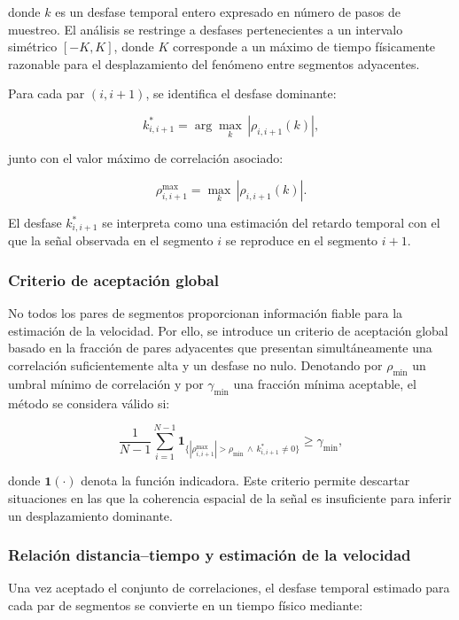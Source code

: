 \documentclass[
  spanish,
  us-letterpaper,
]{scrreprt}
\numberwithin{equation}{section}
\begin{document}
donde \(k\) es un desfase temporal entero expresado en número de pasos
de muestreo. El análisis se restringe a desfases pertenecientes a un
intervalo simétrico \([-K, K]\), donde \(K\) corresponde a un máximo de
tiempo físicamente razonable para el desplazamiento del fenómeno entre
segmentos adyacentes.

Para cada par \((i, i+1)\), se identifica el desfase dominante:

\[
k^*_{i,i+1} = \arg\max_k \, |\rho_{i,i+1}(k)|,
\]

junto con el valor máximo de correlación asociado:

\[
\rho^{\max}_{i,i+1} = \max_k \, |\rho_{i,i+1}(k)|.
\]

El desfase \(k^*_{i,i+1}\) se interpreta como una estimación del retardo
temporal con el que la señal observada en el segmento \(i\) se reproduce
en el segmento \(i+1\).

\subsubsection{Criterio de aceptación
global}\label{criterio-de-aceptaciuxf3n-global}

No todos los pares de segmentos proporcionan información fiable para la
estimación de la velocidad. Por ello, se introduce un criterio de
aceptación global basado en la fracción de pares adyacentes que
presentan simultáneamente una correlación suficientemente alta y un
desfase no nulo. Denotando por \(\rho_{\min}\) un umbral mínimo de
correlación y por \(\gamma_{\min}\) una fracción mínima aceptable, el
método se considera válido si:

\[
\frac{1}{N-1} \sum_{i=1}^{N-1} \mathbf{1}_{\{|\rho^{\max}_{i,i+1}| > \rho_{\min} \, \wedge \, k^*_{i,i+1} \neq 0\}} \geq \gamma_{\min},
\]

donde \(\mathbf{1}(\cdot)\) denota la función indicadora. Este criterio
permite descartar situaciones en las que la coherencia espacial de la
señal es insuficiente para inferir un desplazamiento dominante.

\subsubsection{Relación distancia--tiempo y estimación de la
velocidad}\label{relaciuxf3n-distanciatiempo-y-estimaciuxf3n-de-la-velocidad}

Una vez aceptado el conjunto de correlaciones, el desfase temporal
estimado para cada par de segmentos se convierte en un tiempo físico
mediante:
\end{document}
